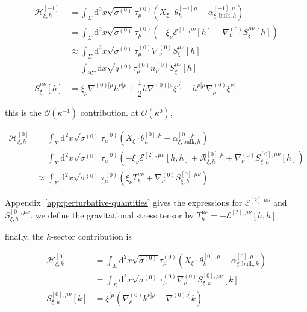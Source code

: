 \begin{align}
\mathcal{H}_{\xi,h}^{[-1]} & =\int _{\Sigma}\mathrm{d}^{2}x\sqrt{ \sigma ^{(0)} }\tau _{\mu}^{(0)}(X_{\xi}\cdot \theta _{h}^{[-1]\mu}-\alpha _{\xi,\mathrm{bulk},h}^{[-1],\mu}) \\
 & =\int _{\Sigma}\mathrm{d}^{2}x\sqrt{ \sigma ^{(0)} }\tau _{\mu}^{(0)}\left(-\xi _{\nu}\mathcal{E}^{[1]\mu \nu}[h]+\nabla ^{(0)}_{\nu}S_{\xi}^{\mu \nu}[h]\right) \\
 & \approx \int _{\Sigma}\mathrm{d}^{2}x\sqrt{ \sigma ^{(0)} }\tau _{\mu}^{(0)}\nabla ^{(0)}_{\nu}S_{\xi}^{\mu \nu}[h] \\
 & =\int _{\partial \Sigma}\mathrm{d}x\sqrt{ q^{(0)} }\tau _{\mu}^{(0)}n_{\nu}^{(0)}S_{\xi}^{\mu \nu}[h] \\
S_{\xi}^{\mu \nu}[h] & =\xi _{\rho}\nabla ^{(0)[\mu}h ^{\nu]\rho}+\dfrac{1}{2}h\nabla ^{(0)[\mu}\xi ^{\nu]}-h^{\rho[\mu}\nabla ^{(0)}_{\rho}\xi ^{\nu]}
\end{align}

this is the $\displaystyle{\mathcal{O}(\kappa ^{-1})}$ contribution. at $\displaystyle{\mathcal{O}(\kappa ^{0})}$,

\begin{align}
\mathcal{H}_{\xi,h}^{[0]} & =\int _{\Sigma}\mathrm{d}^{2}x\sqrt{ \sigma ^{(0)} }\tau _{\mu}^{(0)}\left(X_{\xi}\cdot \theta _{h}^{[0],\mu}-\alpha _{\xi,\mathrm{bulk},h}^{[0],\mu}\right) \\
 & =\int _{\Sigma}\mathrm{d}^{2}x\sqrt{ \sigma ^{(0)} }\tau _{\mu}^{(0)}\left(-\xi _{\nu}\mathcal{E}^{[2],\mu \nu}[h,h]+\mathcal{R}_{\xi,h}^{[0],\mu}+\nabla ^{(0)}_{\nu}S_{\xi,h}^{[0],\mu \nu}[h]\right) \\
 & \approx \int _{\Sigma}\mathrm{d}^{2}x\sqrt{ \sigma ^{(0)} }\tau _{\mu}^{(0)}\left(\xi _{\nu}T^{\mu \nu}_{h}+\nabla ^{(0)}_{\nu}S_{\xi,h}^{[0],\mu \nu}\right)
\end{align}

Appendix~\ref{app:perturbative-quantities} gives the expressions for $\displaystyle{\mathcal{E}^{[2],\mu \nu}}$ and $\displaystyle{S_{\xi,h}^{[0],\mu \nu}}$. we define the gravitational stress tensor by $\displaystyle{T^{\mu \nu}_{h}=-\mathcal{E}^{[2],\mu \nu}[h,h]}$.

finally, the $\displaystyle{k}$-sector contribution is

\begin{align}
\mathcal{H}_{\xi,k}^{[0]} & =\int _{\Sigma}\mathrm{d}^{2}x\sqrt{ \sigma ^{(0)} }\tau _{\mu}^{(0)}(X_{\xi}\cdot \theta ^{[0],\mu}_{k}-\alpha _{\xi,\mathrm{bulk},k}^{[0],\mu}) \\
 & =\int _{\Sigma}\mathrm{d}^{2}x\sqrt{ \sigma ^{(0)} }\tau _{\mu}^{(0)}\nabla ^{(0)}_{\nu}S_{\xi,k}^{[0],\mu \nu}[k] \\
S_{\xi,k}^{[0],\mu \nu}[k] & =\xi ^{[\mu}\left(\nabla _{\rho}^{(0)}k ^{\nu]\rho}-\nabla ^{(0)\nu]}k\right)
\end{align}

